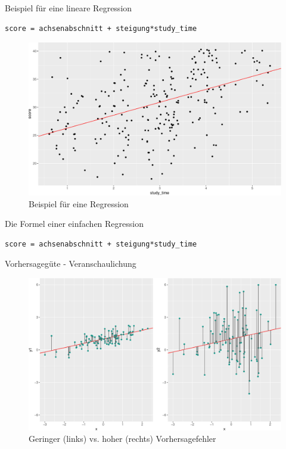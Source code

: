 \begin{frame}[fragile]{Beispiel für eine lineare Regression}

\begin{verbatim}
score = achsenabschnitt + steigung*study_time
\end{verbatim}

\begin{figure}

{\centering \includegraphics[width=0.5\linewidth]{PraDa_Folien_nm_2_files/figure-beamer/bsp-regression-1} 

}

\caption{Beispiel für eine Regression}\label{fig:bsp-regression}
\end{figure}

\end{frame}

\begin{frame}[fragile]{Die Formel einer einfachen Regression}

\begin{verbatim}
score = achsenabschnitt + steigung*study_time
\end{verbatim}

\end{frame}

\begin{frame}{Vorhersagegüte - Veranschaulichung}

\begin{figure}

{\centering \includegraphics[width=0.8\linewidth]{PraDa_Folien_nm_2_files/figure-beamer/resids-plot-1} 

}

\caption{Geringer (links) vs. hoher (rechts) Vorhersagefehler}\label{fig:resids-plot}
\end{figure}

\end{frame}

